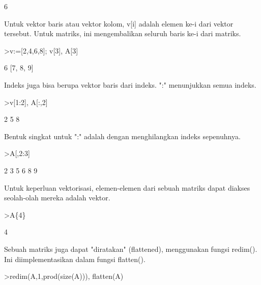 \documentclass[a4paper,10pt]{article}
\begin{document}
\begin{eulernotebook}
\begin{eulercomment}
\begin{eulercomment}
\begin{eulercomment}
\begin{eulercomment}
\begin{eulercomment}
\begin{eulercomment}
\begin{euleroutput}
  6
\end{euleroutput}
\begin{eulercomment}
Untuk vektor baris atau vektor kolom, v[i] adalah elemen ke-i dari
vektor tersebut. Untuk matriks, ini mengembalikan seluruh baris ke-i
dari matriks.
\end{eulercomment}
\begin{eulerprompt}
>v:=[2,4,6,8]; v[3], A[3]
\end{eulerprompt}
\begin{euleroutput}
  6
  [7,  8,  9]
\end{euleroutput}
\begin{eulercomment}
Indeks juga bisa berupa vektor baris dari indeks. ":" menunjukkan
semua indeks.
\end{eulercomment}
\begin{eulerprompt}
>v[1:2], A[:,2]
\end{eulerprompt}
\begin{euleroutput}
  [2,  4]
              2 
              5 
              8 
\end{euleroutput}
\begin{eulercomment}
Bentuk singkat untuk ":" adalah dengan menghilangkan indeks
sepenuhnya.
\end{eulercomment}
\begin{eulerprompt}
>A[,2:3]
\end{eulerprompt}
\begin{euleroutput}
              2             3 
              5             6 
              8             9 
\end{euleroutput}
\begin{eulercomment}
Untuk keperluan vektorisasi, elemen-elemen dari sebuah matriks dapat
diakses seolah-olah mereka adalah vektor.
\end{eulercomment}
\begin{eulerprompt}
>A\{4\}
\end{eulerprompt}
\begin{euleroutput}
  4
\end{euleroutput}
\begin{eulercomment}
Sebuah matriks juga dapat "diratakan" (flattened), menggunakan fungsi
redim(). Ini diimplementasikan dalam fungsi flatten().
\end{eulercomment}
\begin{eulerprompt}
>redim(A,1,prod(size(A))), flatten(A)
\end{eulerprompt}
\begin{euleroutput}
  [1,  2,  3,  4,  5,  6,  7,  8,  9]

\end{euleroutput}
\end{eulercomment}
\end{eulercomment}
\end{eulercomment}
\end{eulercomment}
\end{eulercomment}
\end{eulercomment}
\end{eulernotebook}
\end{document}
